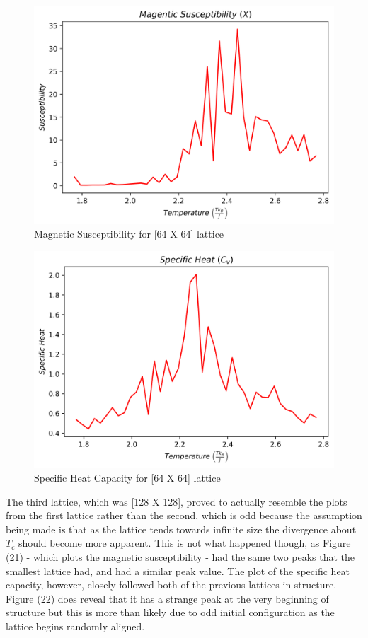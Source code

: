 \documentclass[twocolumn]{article}
\begin{document}
\begin{figure}[H]
\caption{Magnetic Susceptibility for [64 X 64] lattice}
\centering
\includegraphics[scale=.45]{MagSuscept64}
\end{figure}
\begin{figure}[h]
\caption{Specific Heat Capacity for [64 X 64] lattice}
\centering
\includegraphics[scale=.45]{SpecificHeat64}
\end{figure}
The third lattice, which was [128 X 128], proved to actually resemble the plots from the first lattice rather than the second, which is odd because the assumption being made is that as the lattice tends towards infinite size the divergence about $T_c$ should become more apparent. This is not what happened though, as Figure (21) - which plots the magnetic susceptibility - had the same two peaks that the smallest lattice had, and had a similar peak value. The plot of the specific heat capacity, however, closely followed both of the previous lattices in structure. Figure (22) does reveal that it has a strange peak at the very beginning of structure but this is more than likely due to odd initial configuration as the lattice begins randomly aligned. 
\end{document}
